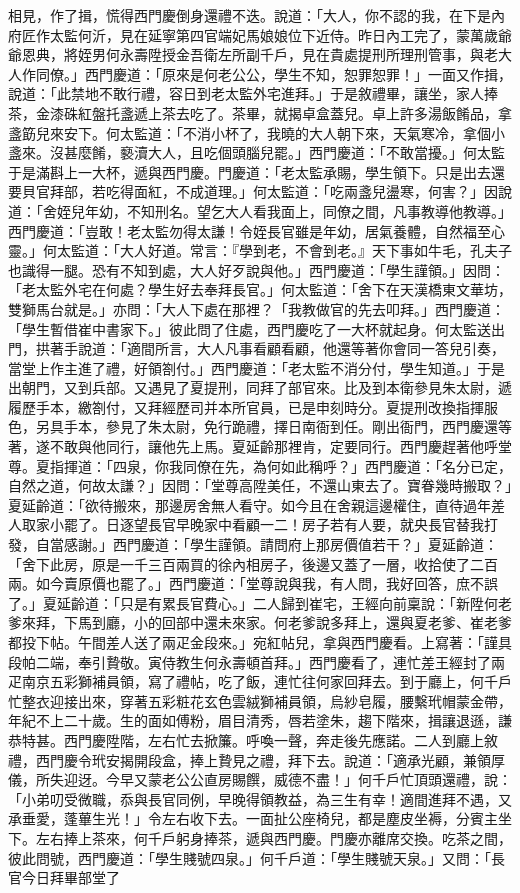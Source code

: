 相見，作了揖，慌得西門慶倒身還禮不迭。說道：「大人，你不認的我，在下是內府匠作太監何沂，見在延寧第四官端妃馬娘娘位下近侍。昨日內工完了，蒙萬歲爺爺恩典，將姪男何永壽陞授金吾衛左所副千戶，見在貴處提刑所理刑管事，與老大人作同僚。」西門慶道：「原來是何老公公，學生不知，恕罪恕罪！」一面又作揖，說道：「此禁地不敢行禮，容日到老太監外宅進拜。」于是敘禮畢，讓坐，家人捧茶，金漆硃紅盤托盞遞上茶去吃了。茶畢，就揭卓盒蓋兒。卓上許多湯飯餚品，拿盞筯兒來安下。何太監道：「不消小杯了，我曉的大人朝下來，天氣寒冷，拿個小盞來。沒甚麼餚，褻瀆大人，且吃個頭腦兒罷。」西門慶道：「不敢當擾。」何太監于是滿斟上一大杯，遞與西門慶。門慶道：「老太監承賜，學生領下。只是出去還要貝官拜部，若吃得面紅，不成道理。」何太監道：「吃兩盞兒盪寒，何害？」因說道：「舍姪兒年幼，不知刑名。望乞大人看我面上，同僚之間，凡事教導他教導。」西門慶道：「豈敢！老太監勿得太謙！令姪長官雖是年幼，居氣養體，自然福至心靈。」何太監道：「大人好道。常言：『學到老，不會到老。』天下事如牛毛，孔夫子也識得一腿。恐有不知到處，大人好歹說與他。」西門慶道：「學生謹領。」因問：「老太監外宅在何處？學生好去奉拜長官。」何太監道：「舍下在天漢橋東文華坊，雙獅馬台就是。」亦問：「大人下處在那裡？「我教做官的先去叩拜。」西門慶道：「學生暫借崔中書家下。」彼此問了住處，西門慶吃了一大杯就起身。何太監送出門，拱著手說道：「適間所言，大人凡事看顧看顧，他還等著你會同一答兒引奏，當堂上作主進了禮，好領劄付。」西門慶道：「老太監不消分付，學生知道。」于是出朝門，又到兵部。又遇見了夏提刑，同拜了部官來。比及到本衛參見朱太尉，遞履歷手本，繳劄付，又拜經歷司并本所官員，已是申刻時分。夏提刑改換指揮服色，另具手本，參見了朱太尉，免行跪禮，擇日南衙到任。剛出衙門，西門慶還等著，遂不敢與他同行，讓他先上馬。夏延齡那裡肯，定要同行。西門慶趕著他呼堂尊。夏指揮道：「四泉，你我同僚在先，為何如此稱呼？」西門慶道：「名分已定，自然之道，何故太謙？」因問：「堂尊高陞美任，不還山東去了。寶眷幾時搬取？」夏延齡道：「欲待搬來，那邊房舍無人看守。如今且在舍親這邊權住，直待過年差人取家小罷了。日逐望長官早晚家中看顧一二！房子若有人要，就央長官替我打發，自當感謝。」西門慶道：「學生謹領。請問府上那房價值若干？」夏延齡道：「舍下此房，原是一千三百兩買的徐內相房子，後邊又蓋了一層，收拾使了二百兩。如今賣原價也罷了。」西門慶道：「堂尊說與我，有人問，我好回答，庶不誤了。」夏延齡道：「只是有累長官費心。」二人歸到崔宅，王經向前稟說：「新陞何老爹來拜，下馬到廳，小的回部中還未來家。何老爹說多拜上，還與夏老爹、崔老爹都投下帖。午間差人送了兩疋金段來。」宛紅帖兒，拿與西門慶看。上寫著：「謹具段帕二端，奉引贄敬。寅侍教生何永壽頓首拜。」西門慶看了，連忙差王經封了兩疋南京五彩獅補員領，寫了禮帖，吃了飯，連忙往何家回拜去。到于廳上，何千戶忙整衣迎接出來，穿著五彩粧花玄色雲絨獅補員領，烏紗皂履，腰繫玳帽蒙金帶，年紀不上二十歲。生的面如傅粉，眉目清秀，唇若塗朱，趨下階來，揖讓退遜，謙恭特甚。西門慶陞階，左右忙去掀簾。呼喚一聲，奔走後先應諾。二人到廳上敘禮，西門慶令玳安揭開段盒，捧上贄見之禮，拜下去。說道：「適承光顧，兼領厚儀，所失迎迓。今早又蒙老公公直房賜饌，威德不盡！」何千戶忙頂頭還禮，說：「小弟叨受微職，忝與長官同例，早晚得領教益，為三生有幸！適間進拜不遇，又承垂愛，蓬蓽生光！」令左右收下去。一面扯公座椅兒，都是塵皮坐褥，分賓主坐下。左右捧上茶來，何千戶躬身捧茶，遞與西門慶。門慶亦離席交換。吃茶之間，彼此問號，西門慶道：「學生賤號四泉。」何千戶道：「學生賤號天泉。」又問：「長官今日拜畢部堂了